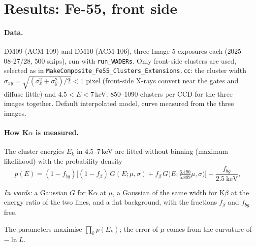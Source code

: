 \documentclass[11pt,a4paper]{article}
\newcommand{\code}[1]{\texttt{#1}}
\newcommand{\inwords}[1]{\par\noindent\textit{In words:} #1\par}
\begin{document}
\section{Results: Fe-55, front side}
\label{sec:fe55}
\paragraph{Data.} DM09 (ACM 109) and DM10 (ACM 106), three Image 5 exposures each (2025-08-27/28,
500 skips), run with \code{run\_WADERs}. Only front-side clusters are used, selected as in
\code{MakeComposite\_Fe55\_Clusters\_Extensions.cc}: the cluster width
$\sigma_{xy} = \sqrt{(\sigma_x^2 + \sigma_y^2)/2} < 1$ pixel (front-side X-rays convert near the gates and
diffuse little) and $4.5 < E < 7$\,keV; 850--1090 clusters per CCD for the three images together.
Default interpolated model, curve measured from the three images.

\paragraph{How K$\alpha$ is measured.} The cluster energies $E_k$ in 4.5--7\,keV are fitted without
binning (maximum likelihood) with the probability density
\begin{equation}
p(E) = (1 - f_{bg})\Big[(1 - f_\beta)\,G(E; \mu, \sigma) + f_\beta\,G\big(E; \tfrac{6.490}{5.899}\mu, \sigma\big)\Big]
+ \frac{f_{bg}}{2.5\ \mathrm{keV}},
\end{equation}
\inwords{a Gaussian $G$ for K$\alpha$ at $\mu$, a Gaussian of the same width for K$\beta$ at the energy
ratio of the two lines, and a flat background, with the fractions $f_\beta$ and $f_{bg}$ free.} The
parameters maximise $\prod_k p(E_k)$; the error of $\mu$ comes from the curvature of $-\ln L$.
\end{document}
